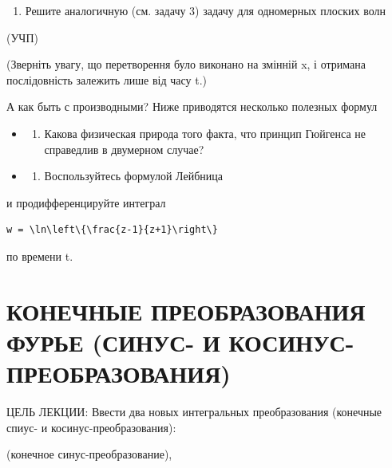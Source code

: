 \documentclass[
  ukrainian,
]{article}
\providecommand{\tightlist}{%
  \setlength{\itemsep}{0pt}\setlength{\parskip}{0pt}}
\begin{document}
\begin{enumerate}
\def\labelenumi{\arabic{enumi}.}
\setcounter{enumi}{4}
\tightlist
\item
  Решите аналогичную (см. задачу 3) задачу для одномерных плоских волн
\end{enumerate}

(УЧП)

(Зверніть увагу, що перетворення було виконано на змінній x, і отримана
послідовність залежить лише від часу t.)

А как быть с производными? Ниже приводятся несколько полезных формул

\begin{itemize}
\tightlist
\item
  \begin{enumerate}
  \def\labelenumi{\arabic{enumi}.}
  \setcounter{enumi}{5}
  \tightlist
  \item
    Какова физическая природа того факта, что принцип Гюйгенса не
    справедлив в двумерном случае?
  \end{enumerate}
\item
  \begin{enumerate}
  \def\labelenumi{\arabic{enumi}.}
  \setcounter{enumi}{6}
  \tightlist
  \item
    Воспользуйтесь формулой Лейбница
  \end{enumerate}
\end{itemize}

и продифференцируйте интеграл

\begin{verbatim}
w = \ln\left\{\frac{z-1}{z+1}\right\}
\end{verbatim}

по времени t.

\section{КОНЕЧНЫЕ ПРЕОБРАЗОВАНИЯ ФУРЬЕ (СИНУС- И
КОСИНУС-ПРЕОБРАЗОВАНИЯ)}\label{ux43aux43eux43dux435ux447ux43dux44bux435-ux43fux440ux435ux43eux431ux440ux430ux437ux43eux432ux430ux43dux438ux44f-ux444ux443ux440ux44cux435-ux441ux438ux43dux443ux441--ux438-ux43aux43eux441ux438ux43dux443ux441-ux43fux440ux435ux43eux431ux440ux430ux437ux43eux432ux430ux43dux438ux44f}

ЦЕЛЬ ЛЕКЦИИ: Ввести два новых интегральных преобразования (конечные
спиус- и косинус-преобразования):

(конечное синус-преобразование),
\end{document}
